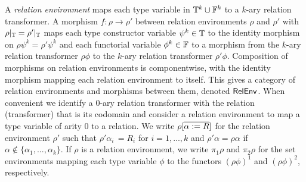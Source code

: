 \documentclass[runningheads]{llncs}
\begin{document}
A {\em relation environment} maps each type variable in $\mathbb{T}^k \cup
\mathbb{F}^k$ to a $k$-ary relation transformer.  A morphism $f : \rho \to
\rho'$ between relation environments $\rho$ and $\rho'$ with
$\rho|_{\mathbb{T}} = \rho'|_{\mathbb{T}}$ maps each type constructor variable
$\psi^k \in \mathbb{T}$ to the identity morphism on $\rho \psi^k = \rho'
\psi^k$ and each functorial variable $\phi^k \in \mathbb{F}$ to a morphism
from the $k$-ary relation transformer $\rho \phi$ to the $k$-ary
relation transformer $\rho' \phi$. Composition of morphisms on
relation environments is componentwise, with the identity
morphism mapping each relation environment to itself. This gives a
category of relation environments and morphisms between them, 
denoted $\mathsf{RelEnv}$.
When convenient we identify a $0$-ary relation transformer with the
relation (transformer) that is its codomain and consider
a relation environment to map a type variable of arity $0$
to a relation.  We write $\rho[\overline{\alpha := R}]$ for the relation
environment $\rho'$ such that $\rho' \alpha_i \, = R_i$ for $i =
1,...,k$ and $\rho' \alpha = \rho\alpha$ if $\alpha \not \in
\{\alpha_1,...,\alpha_k\}$.  If $\rho$ is a relation environment, we
write $\pi_1 \rho$ and $\pi_2 \rho$ for the set environments mapping
each type variable $\phi$ to the functors $(\rho\phi)^1$ and
$(\rho\phi)^2$, respectively.
\end{document}
